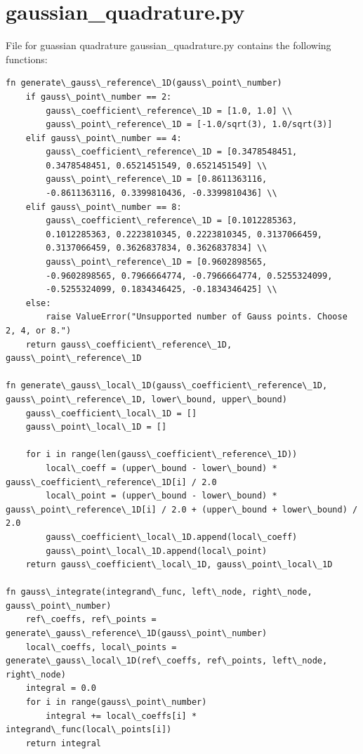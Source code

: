 \documentclass[12pt, oneside]{book}
\begin{document}
\section{gaussian\_quadrature.py}

File for guassian quadrature gaussian\_quadrature.py contains the following functions:

\begin{lstlisting}
fn generate\_gauss\_reference\_1D(gauss\_point\_number)
    if gauss\_point\_number == 2:
        gauss\_coefficient\_reference\_1D = [1.0, 1.0] \\
        gauss\_point\_reference\_1D = [-1.0/sqrt(3), 1.0/sqrt(3)]
    elif gauss\_point\_number == 4:
        gauss\_coefficient\_reference\_1D = [0.3478548451, 
        0.3478548451, 0.6521451549, 0.6521451549] \\
        gauss\_point\_reference\_1D = [0.8611363116, 
        -0.8611363116, 0.3399810436, -0.3399810436] \\
    elif gauss\_point\_number == 8:
        gauss\_coefficient\_reference\_1D = [0.1012285363, 
        0.1012285363, 0.2223810345, 0.2223810345, 0.3137066459, 
        0.3137066459, 0.3626837834, 0.3626837834] \\
        gauss\_point\_reference\_1D = [0.9602898565, 
        -0.9602898565, 0.7966664774, -0.7966664774, 0.5255324099, 
        -0.5255324099, 0.1834346425, -0.1834346425] \\
    else:
        raise ValueError("Unsupported number of Gauss points. Choose 2, 4, or 8.")
    return gauss\_coefficient\_reference\_1D, gauss\_point\_reference\_1D

fn generate\_gauss\_local\_1D(gauss\_coefficient\_reference\_1D, gauss\_point\_reference\_1D, lower\_bound, upper\_bound)
    gauss\_coefficient\_local\_1D = []
    gauss\_point\_local\_1D = []

    for i in range(len(gauss\_coefficient\_reference\_1D))
        local\_coeff = (upper\_bound - lower\_bound) * gauss\_coefficient\_reference\_1D[i] / 2.0
        local\_point = (upper\_bound - lower\_bound) * gauss\_point\_reference\_1D[i] / 2.0 + (upper\_bound + lower\_bound) / 2.0
        gauss\_coefficient\_local\_1D.append(local\_coeff)
        gauss\_point\_local\_1D.append(local\_point)
    return gauss\_coefficient\_local\_1D, gauss\_point\_local\_1D

fn gauss\_integrate(integrand\_func, left\_node, right\_node, gauss\_point\_number)
    ref\_coeffs, ref\_points = generate\_gauss\_reference\_1D(gauss\_point\_number)
    local\_coeffs, local\_points = generate\_gauss\_local\_1D(ref\_coeffs, ref\_points, left\_node, right\_node)
    integral = 0.0
    for i in range(gauss\_point\_number)
        integral += local\_coeffs[i] * integrand\_func(local\_points[i])
    return integral
\end{lstlisting}
\end{document}
